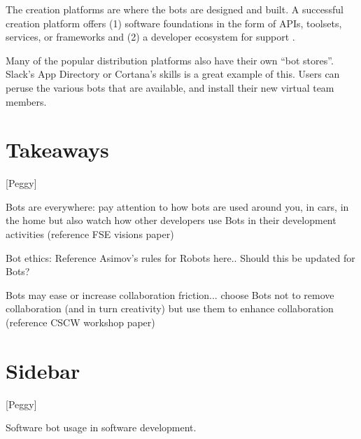 \documentclass{sig-alternate}
\begin{document}
	The creation platforms are where the bots are designed and built.  A successful creation platform offers (1) software foundations in the form of APIs, toolsets, services, or frameworks and (2) a developer ecosystem for support \footnotemark{\ref{messenger-vs-skype-vs-slack-vs-telegram-how-to-spot-the-winners-adc34b4ca066}}.

	Many of the popular distribution platforms also have their own ``bot stores''. Slack's App Directory or Cortana's skills is a great example of this. Users can peruse the various bots that are available, and install their new virtual team members. 



\section{Takeaways}

[Peggy]

	Bots are everywhere: pay attention to how bots are used around you, in cars, in the home but also watch how other developers use Bots in their development activities (reference FSE visions paper)
	
	Bot ethics:  Reference Asimov's rules for Robots here..   Should this be updated for Bots?
	
	Bots may ease or increase collaboration friction...  choose Bots not to remove collaboration (and in turn creativity) but use them to enhance collaboration (reference CSCW workshop paper)



\section{Sidebar}

[Peggy]

Software bot usage in software development.




%



%


%

\listoftodos
%
%
\end{document}
